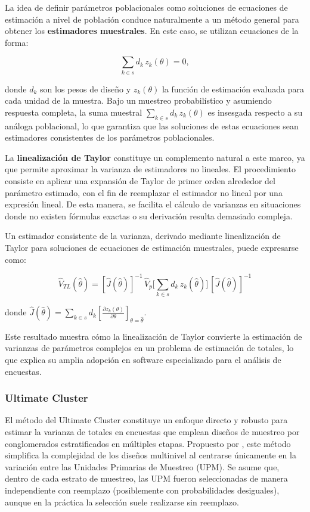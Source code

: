 \documentclass[
  spanish,
  12pt,
]{book}
\begin{document}
La idea de definir parámetros poblacionales como soluciones de ecuaciones de estimación a nivel de población conduce naturalmente a un método general para obtener los \textbf{estimadores muestrales}. En este caso, se utilizan ecuaciones de la forma:

\[
\sum_{k\in s} d_k\, z_k(\theta)=0,
\]

donde \(d_k\) son los pesos de diseño y \(z_k(\theta)\) la función de estimación evaluada para cada unidad de la muestra. Bajo un muestreo probabilístico y asumiendo respuesta completa, la suma muestral \(\sum_{k\in s} d_k\, z_k(\theta)\) es insesgada respecto a su análoga poblacional, lo que garantiza que las soluciones de estas ecuaciones sean estimadores consistentes de los parámetros poblacionales.

La \textbf{linealización de Taylor} constituye un complemento natural a este marco, ya que permite aproximar la varianza de estimadores no lineales. El procedimiento consiste en aplicar una expansión de Taylor de primer orden alrededor del parámetro estimado, con el fin de reemplazar el estimador no lineal por una expresión lineal. De esta manera, se facilita el cálculo de varianzas en situaciones donde no existen fórmulas exactas o su derivación resulta demasiado compleja.

Un estimador consistente de la varianza, derivado mediante linealización de Taylor para soluciones de ecuaciones de estimación muestrales, puede expresarse como:

\[
\hat{V}_{TL}(\hat{\theta}) = [\hat{J}(\hat{\theta})]^{-1} \, \hat{V}_p \Bigg[\sum_{k\in s} d_k\, z_k(\hat{\theta})\Bigg] \, [\hat{J}(\hat{\theta})]^{-1}
\]

donde \(\hat{J}(\hat{\theta}) = \sum_{k\in s} d_k \left[ \frac{\partial z_k(\theta)}{\partial \theta} \right]_{\theta=\hat{\theta}}\).

Este resultado muestra cómo la linealización de Taylor convierte la estimación de varianzas de parámetros complejos en un problema de estimación de totales, lo que explica su amplia adopción en software especializado para el análisis de encuestas.

\subsubsection*{Ultimate Cluster}\label{ultimate-cluster}

El método del Ultimate Cluster constituye un enfoque directo y robusto para estimar la varianza de totales en encuestas que emplean diseños de muestreo por conglomerados estratificados en múltiples etapas. Propuesto por \citet{hansen1953sample}, este método simplifica la complejidad de los diseños multinivel al centrarse únicamente en la variación entre las Unidades Primarias de Muestreo (UPM). Se asume que, dentro de cada estrato de muestreo, las UPM fueron seleccionadas de manera independiente con reemplazo (posiblemente con probabilidades desiguales), aunque en la práctica la selección suele realizarse sin reemplazo.
\end{document}
